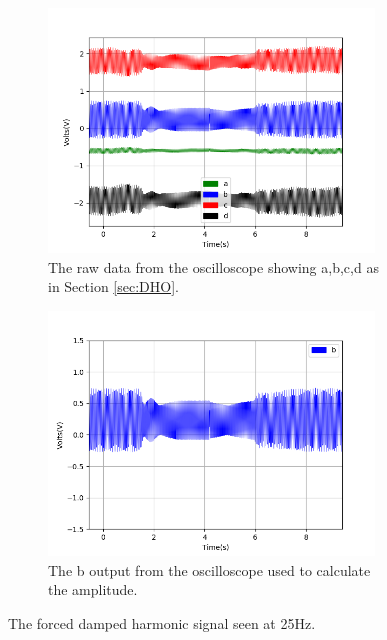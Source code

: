 \begin{figure}[h!]
\centering
\begin{subfigure}[t]{.475\textwidth}
  \centering
  \includegraphics[width=0.95\textwidth, height=0.20\textheight]{figures/FDHO/scope_45raw.png}
  \caption{The raw data from the oscilloscope showing a,b,c,d as in Section \ref{sec:DHO}.}
 \label{fig:FDHO_25Hz_raw}
\end{subfigure}\hfill
\begin{subfigure}[t]{.475\textwidth}
  \centering
  \includegraphics[width=0.95\textwidth, height=0.20\textheight]{figures/FDHO/scope_45v_2.png}
  \caption{The b output from the oscilloscope used to calculate the amplitude.}
\label{fig:FDHO_25Hz_b}
\end{subfigure}
\caption{The forced damped harmonic signal seen at 25Hz.}
\label{fig:FDHO_25Hz}
\end{figure}

